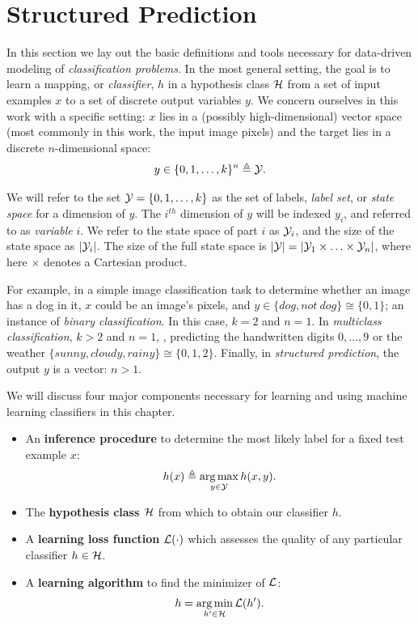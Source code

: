 \chapter{Structured Prediction}\label{sec:ml}

In this section we lay out the basic definitions and tools necessary for 
data-driven modeling of {\em classification problems}.  In the most general 
setting, the goal is to learn a mapping, or {\em classifier}, $h$ in a 
hypothesis class $\mathcal{H}$ from a set of input examples $x$ to a set of discrete 
output variables $y$.   We concern ourselves in this work with a specific 
setting: $x$ lies in a (possibly high-dimensional) vector space (most commonly 
in this work, the input image pixels) and the target lies in a discrete 
$n$-dimensional space: $$y \in \{0,1,\ldots,k\}^n \triangleq \mathcal{Y}.$$  

We will refer to the set $\mathcal{Y} = \{0,1,\ldots,k\}$ as the set of labels, {\em 
label set}, or {\em state space} for a dimension of $y$.  The $i^{th}$ 
dimension of $y$ will be indexed $y_i$, and referred to as {\em variable} $i$.  
We refer to the state space of part $i$ as $\mathcal{Y}_i$, and the size of the state 
space as $|\mathcal{Y}_i|$.  The size of the full state space is $|\mathcal{Y}| = |\mathcal{Y}_1 \times 
\ldots \times \mathcal{Y}_n|$, where here $\times$ denotes a Cartesian product.

For example, in a simple image classification task to determine whether an 
image has a dog in it, $x$ could be an image's pixels, and $y \in \{dog, 
not~dog\} \cong \{0,1\} $; an instance of {\em binary classification}.  In this 
case, $k = 2$ and $n = 1$.  In {\em multiclass classification}, $k>2$ and $n = 
1$, \eg, predicting the handwritten digits $0,\dots,9$ or the weather $\{sunny, 
cloudy, rainy\} \cong \{0,1,2\}$.  Finally, in {\em structured prediction}, the 
output $y$ is a vector: $n > 1$.

We will discuss four major components necessary for learning and using machine 
learning classifiers in this chapter.

\begin{itemize}
\item An {\bf inference procedure} to determine the most likely label for a 
fixed test example $x$: \begin{equation}
h(x) \triangleq \mathop{\arg\max}_{y \in \mathcal{Y}} h(x,y).
\end{equation}
\item The {\bf hypothesis class $\mathcal{H}$} from which to obtain our classifier $h$.
\item  A {\bf learning loss function} $\mathcal{L}(\cdot)$ which assesses the quality 
of any particular classifier $h \in \mathcal{H}$.
\item A {\bf learning algorithm} to find the minimizer of $\mathcal{L}$: 
\begin{equation}
h = \mathop{\arg\min}_{h' \in \mathcal{H}} \mathcal{L}(h').
\end{equation}
\end{itemize}

